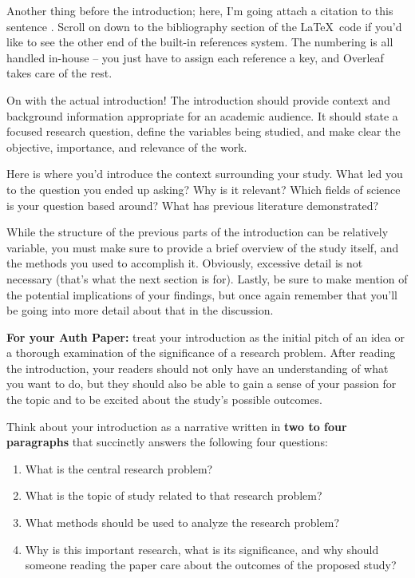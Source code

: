 \documentclass[10pt,twocolumn,letterpaper]{article}
\begin{document}
Another thing before the introduction; here, I'm going attach a citation to this sentence \cite{latexcompanion}. Scroll on down to the bibliography section of the \LaTeX\ code if you'd like to see the other end of the built-in references system. The numbering is all handled in-house -- you just have to assign each reference a key, and Overleaf takes care of the rest.

On with the actual introduction! The introduction should provide context and background information appropriate for an academic audience. It should state a focused research question, define the variables being studied, and make clear the objective, importance, and relevance of the work.

Here is where you'd introduce the context surrounding your study. What led you to the question you ended up asking? Why is it relevant? Which fields of science is your question based around? What has previous literature demonstrated?

While the structure of the previous parts of the introduction can be relatively variable, you must make sure to provide a brief overview of the study itself, and the methods you used to accomplish it. Obviously, excessive detail is not necessary (that's what the next section is for). Lastly, be sure to make mention of the potential implications of your findings, but once again remember that you'll be going into more detail about that in the discussion.

\textbf{For your Auth Paper:} treat your introduction as the initial pitch of an idea or a thorough examination of the significance of a research problem. After reading the introduction, your readers should not only have an understanding of what you want to do, but they should also be able to gain a sense of your passion for the topic and to be excited about the study's possible outcomes.

Think about your introduction as a narrative written in \textbf{two to four paragraphs} that succinctly answers the following four questions:
\begin{enumerate}
   \item What is the central research problem?
   \item What is the topic of study related to that research problem?
    \item What methods should be used to analyze the research problem?
   \item Why is this important research, what is its significance, and why should someone reading the paper care about the outcomes of the proposed study?
\end{enumerate}
\end{document}
